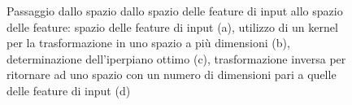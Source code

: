 \documentclass[oneside, openany]{book}
\begin{document}
		\begin{figure}[h]
		\centering
		 \quad
		 \quad
		 \quad
		 \quad
		\caption{Passaggio dallo spazio dallo spazio delle feature di input allo spazio delle feature: spazio delle feature di input (a), utilizzo di un kernel per la trasformazione in uno spazio a più dimensioni (b), determinazione dell'iperpiano ottimo (c), trasformazione inversa per ritornare ad uno spazio con un numero di dimensioni pari a quelle delle feature di input (d)}
		\label{fig:hyp}
	\end{figure}	
\end{document}
